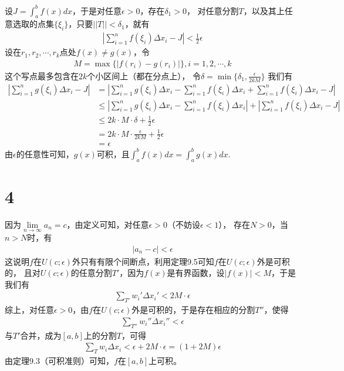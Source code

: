 \documentclass{article}
\begin{document}
设$J = \int_a^b f(x)dx$，于是对任意$\epsilon > 0$，存在$\delta_1 > 0$，
对任意分割$T$，以及其上任意选取的点集$\{\xi_i\}$，只要$||T|| < \delta_1$，就有
\begin{align*}
  \left| \sum\limits_{i = 1}^n f(\xi_i) \Delta x_i - J \right| < \frac{1}{2} \epsilon
\end{align*}
设在$r_1, r_2, \cdots, r_k$点处$f(x) \neq g(x)$，令
\begin{align*}
  M = \max\{|f(r_i) - g(r_i)|\}, i = 1, 2, \cdots, k
\end{align*}
这个写点最多包含在$2k$个小区间上（都在分点上），
令$\delta = \min\{\delta_1, \frac{\epsilon}{2kM} \}$
我们有
\begin{align*}
  \left| \sum\limits_{i = 1}^n g(\xi_i) \Delta x_i - J \right|
   & = \left| \sum\limits_{i = 1}^n g(\xi_i) \Delta x_i - \sum\limits_{i = 1}^n f(\xi_i) \Delta x_i + \sum\limits_{i = 1}^n f(\xi_i) \Delta x_i - J \right|                  \\
   & \leq \left| \sum\limits_{i = 1}^n g(\xi_i) \Delta x_i - \sum\limits_{i = 1}^n f(\xi_i) \Delta x_i\right| + \left| \sum\limits_{i = 1}^n f(\xi_i) \Delta x_i - J \right| \\
   & \leq 2k \cdot M \cdot \delta + \frac{1}{2}\epsilon                                                                                                                      \\
   & = 2k \cdot M \cdot \frac{\epsilon}{2k M} + \frac{1}{2}\epsilon                                                                                                          \\
   & = \epsilon
\end{align*}
由$\epsilon$的任意性可知，$g(x)$可积，且$\int_{a}^{b} f(x) dx = \int_{a}^{b} g(x) dx$.

\section*{4}

因为$\lim\limits_{n \to \infty} a_n = c$，由定义可知，对任意$\epsilon > 0$（不妨设$\epsilon < 1$），
存在$N > 0$，当$n > N$时，有
\begin{align*}
  |a_n - c| < \epsilon
\end{align*}
这说明$f$在$U(c; \epsilon)$外只有有限个间断点，利用定理9.5可知$f$在$U(c; \epsilon)$外是可积的，
且对$U(c; \epsilon)$的任意分割$T'$，因为$f(x)$是有界函数，设$|f(x)| < M$，于是我们有
\begin{align*}
  \sum\limits_{T'} w_i' \Delta x_i' < 2 M \cdot \epsilon
\end{align*}
综上，对任意$\epsilon > 0$，由$f$在$U(c; \epsilon)$外是可积的，于是存在相应的分割$T''$，使得
\begin{align*}
  \sum\limits_{T''} w_i'' \Delta x_i'' < \epsilon
\end{align*}
与$T'$合并，成为$[a,b]$上的分割$T$，可得
\begin{align*}
  \sum\limits_{T} w_i \Delta x_i < \epsilon + 2 M \cdot \epsilon = (1 + 2M) \epsilon
\end{align*}
由定理9.3（可积准则）可知，$f$在$[a,b]$上可积。
\end{document}
